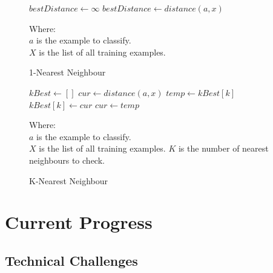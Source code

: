 \documentclass[11pt,fleqn,twoside]{article}
\begin{document}
\begin{figure}
\begin{algorithmic}
\State $bestDistance \gets \infty$
		\State $bestDistance \gets distance(a, x)$
	\EndIf
\EndFor
\end{algorithmic}

Where:\\
\(a\) is the example to classify.\\
\(X\) is the list of all training examples.
\caption{1-Nearest Neighbour}
\label{fig:1-nn}
\end{figure}

\begin{figure}
\begin{algorithmic}
\State $kBest \gets []$
	\State $cur \gets distance(a, x)$
			\State $temp \gets kBest[k]$
			\State $kBest[k] \gets cur$
			\State $cur \gets temp$
		\EndIf
	\EndFor
\EndFor
\end{algorithmic}
Where:\\
$a$ is the example to classify.\\
$X$ is the list of all training examples.
$K$ is the number of nearest neighbours to check.
\caption{K-Nearest Neighbour}
\label{fig:k-nn}
\end{figure}



\section{Current Progress}

\subsection{Technical Challenges}
\end{document}
